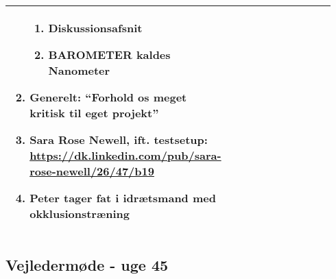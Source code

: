 \begin{longtable}{|p{0.24\linewidth}|p{0.7\linewidth}|}
\begin{enumerate}
\begin{enumerate}
				\item Diskussionsafsnit
				\item BAROMETER kaldes Nanometer 
			\end{enumerate}
			\item Generelt: “Forhold os meget kritisk til eget projekt”
			\item Sara Rose Newell, ift. testsetup: \url{https://dk.linkedin.com/pub/sara-rose-newell/26/47/b19}
			\item Peter tager fat i idrætsmand med okklusionstræning
		\end{enumerate}
		\\ \hline
	\end{longtable}
	
	\subsection{Vejledermøde - uge 45}
